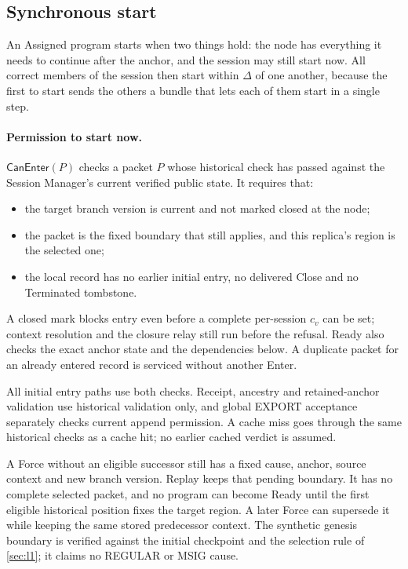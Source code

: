 \documentclass[11pt,a4paper]{article}
\newcommand{\tagg}[1]{\ensuremath{\mathsf{#1}}}
\begin{document}
\subsection{Synchronous start}
\label{sec:ready}
An Assigned program starts when two things hold: the node has
everything it needs to continue after the anchor, and the session may
still start now. All correct members of the session then start within
$\Delta$ of one another, because the first to start sends the others a
bundle that lets each of them start in a single step.

\paragraph{Permission to start now.}
\label{sec:can-enter}
$\tagg{CanEnter}(P)$ checks a packet $P$ whose historical check has
passed against the Session Manager's current verified public state. It
requires that:
\begin{itemize}
\item the target branch version is current and not marked closed at
the node;
\item the packet is the fixed boundary that still applies, and this
replica's region is the selected one;
\item the local record has no earlier initial entry, no delivered Close
and no Terminated tombstone.
\end{itemize}
A closed mark blocks entry even before a complete per-session $c_v$ can
be set; context resolution and the closure relay still run before the
refusal. Ready also checks the exact anchor state and the dependencies
below. A duplicate packet for an already entered record is serviced
without another Enter.

All initial entry paths use both checks. Receipt, ancestry and
retained-anchor validation use historical validation only, and global
EXPORT acceptance separately checks current append permission. A cache
miss goes through the same historical checks as a cache hit; no earlier
cached verdict is assumed.

A Force without an eligible successor still has a fixed cause, anchor,
source context and new branch version. Replay keeps that
pending boundary. It has no complete selected packet, and no program can
become Ready until the first eligible historical position fixes the
target region. A later Force can supersede it while keeping the same
stored predecessor context. The synthetic genesis boundary is verified
against the initial checkpoint and the selection rule of \cref{sec:l1};
it claims no REGULAR or MSIG cause.
\end{document}
